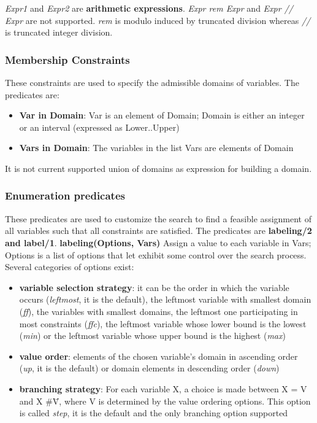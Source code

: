 \textit{Expr1} and \textit{Expr2} are \textbf{arithmetic expressions}.
\textit{Expr rem Expr} and \textit{Expr // Expr} are not supported. \textit{rem} is modulo induced by truncated division
whereas \textit{//} is truncated integer division.

\subsubsection{Membership Constraints}\label{subsubsec:Membership}

These constraints are used to specify the admissible domains of variables.\newline
The predicates are:\newline
\begin{itemize}
    \item \textbf{Var in Domain}: Var is an element of Domain; Domain is either an integer or an interval (expressed as Lower..Upper)
    \item \textbf{Vars in Domain}: The variables in the list Vars are elements of Domain
\end{itemize}

It is not current supported union of domains as expression for building a domain.

\subsubsection{Enumeration predicates}\label{subsubsec:enumeration}

These predicates are used to customize the search to find a feasible assignment of all variables such that all constraints are satisfied.\newline
The predicates are \textbf{labeling/2 and label/1}.\newline\newline
\textbf{labeling(Options, Vars)}\newline\newline
Assign a value to each variable in Vars; Options is a list of options that let exhibit some control over the search process. Several categories of options exist:
\begin{itemize}
    \item \textbf{variable selection strategy}: it can be the order in which the variable occurs (\textit{leftmost}, it is the default), the leftmost variable with smallest domain (\textit{ff}), the variables with smallest domains, the leftmost one participating in most constraints (\textit{ffc}), the leftmost variable whose lower bound is the lowest (\textit{min}) or the leftmost variable whose upper bound is the highest (\textit{max})
    \item \textbf{value order}: elements of the chosen variable's domain in ascending order (\textit{up}, it is the default) or domain elements in descending order (\textit{down})
    \item \textbf{branching strategy}: For each variable X, a choice is made between X = V and X \#\= V, where V is determined by the value ordering options. This option is called \textit{step}, it is the default and the only branching option supported
\end{itemize}

